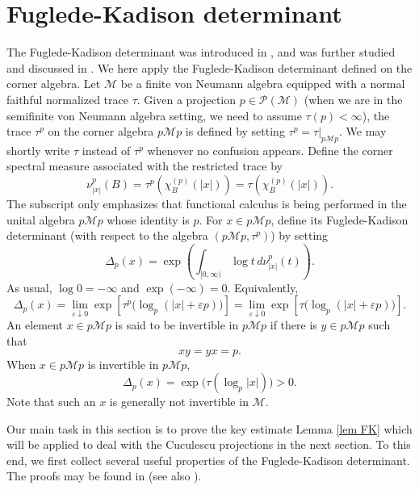 \documentclass[11]{amsart}
\numberwithin{equation}{section}
\newcommand{\M}{\mathcal{M}}
\begin{document}
\section{Fuglede-Kadison determinant}\label{sec FK deter}
The Fuglede-Kadison determinant was introduced in \cite{FK1952}, and was further studied and discussed in  \cite{DDSZ2020,HS2007}. We here apply  the  Fuglede-Kadison determinant defined on the corner algebra. Let $\mathcal M$ be a finite von Neumann algebra equipped with a normal faithful normalized  trace $\tau$.  Given a projection $p\in \mathcal{P}(\mathcal{M})$ (when we are in the semifinite von Neumann algebra setting, we need to assume  $\tau(p)<\infty$), the trace  $\tau^p$ on the  corner algebra $p\mathcal{M}p$ is defined by setting $\tau^p=\tau|_{p\mathcal{M}p}$. We may shortly write $\tau$  instead of $\tau^p$ whenever no confusion appears.  
Define the corner spectral
measure associated with the restricted trace by
\[
\nu^p_{|x|}(B)
=\tau^p(\chi^{(p)}_B(|x|))
=\tau(\chi^{(p)}_B(|x|)).
\]
The subscript only emphasizes that functional calculus is being performed in
the unital algebra  $p\mathcal{M}p$  whose identity is \(p\).
For \(x\in p\M p\), define its Fuglede-Kadison determinant (with respect to the algebra $(p\M p, \tau^p)$) by setting
\begin{equation}\label{eq:corner-det}
		\Delta_p(x)
		=
		\exp\left(
		\int_{[0,\infty)}\log t\,d\nu^p_{|x|}(t)
		\right).
\end{equation}
As usual, \(\log0=-\infty\) and \(\exp(-\infty)=0\).
Equivalently,
\begin{equation}\label{eq:regularization}
		\Delta_p (x)
		=
		\lim_{\varepsilon\downarrow0}
		\exp\left[
		\tau^p\bigl(\log_p(|x|+\varepsilon p)\bigr)
		\right]=	\lim_{\varepsilon\downarrow0}
		\exp\left[
		\tau\bigl(\log_p(|x|+\varepsilon p)\bigr)
		\right].
\end{equation}
An element \(x\in p\M p\) is said to be invertible in $p\M p$ if there is
\(y\in p\M p\) such that
\[
xy=yx=p.
\]
When \(x\in p\M p\) is invertible in $p\M p$,
\begin{equation}\label{eq:invertible-corner}
	\Delta_p(x)
	=
	\exp\bigl(\tau(\log_p|x|)\bigr)>0.
\end{equation}
Note that such an \(x\) is generally not invertible in \(\M\).

Our main task in this section is to prove the key estimate Lemma \ref{lem FK} which will be applied to deal with the Cuculescu projections in the next section. 
To this end, we first collect several useful properties of the Fuglede-Kadison determinant. The proofs may be found in \cite{HS2007} (see also \cite{FK1952}). 
\end{document}
